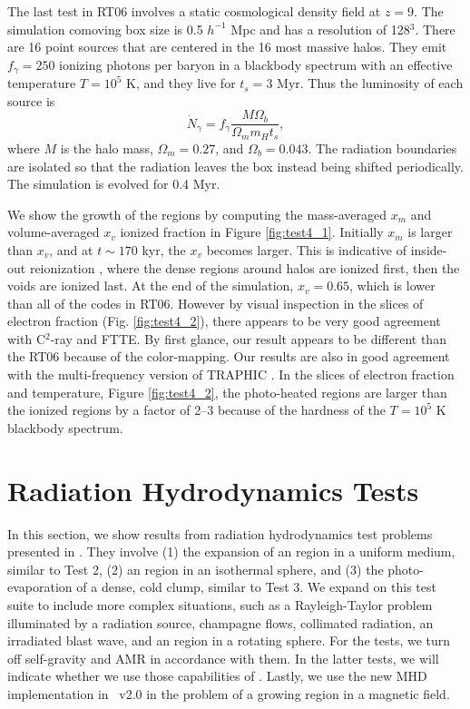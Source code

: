 \documentclass[apj,onecolumn]{emulateapj}
\begin{document}
The last test in RT06 involves a static cosmological density field at
$z=9$.  The simulation comoving box size is 0.5 $h^{-1}$ Mpc and has a
resolution of 128$^3$.  There are 16 point sources that are centered
in the 16 most massive halos.  They emit $f_\gamma = 250$ ionizing
photons per baryon in a blackbody spectrum with an effective
temperature $T = 10^5$ K, and they live for $t_s = 3$ Myr.  Thus the
luminosity of each source is
%
\begin{equation}
  \label{eqn:cosmo_lum}
  \dot{N}_\gamma = f_\gamma \frac{M \Omega_b} {\Omega_m m_H t_s},
\end{equation}
where $M$ is the halo mass, $\Omega_m = 0.27$, and $\Omega_b =
0.043$.  The radiation boundaries are isolated so that the radiation
leaves the box instead being shifted periodically.  The simulation is
evolved for 0.4 Myr.

We show the growth of the  regions by computing the
mass-averaged $x_m$ and volume-averaged $x_v$ ionized fraction in
Figure \ref{fig:test4_1}.  Initially $x_m$ is larger than $x_v$, and
at $t \sim 170$ kyr, the $x_v$ becomes larger.  This is indicative of
inside-out reionization \citep[e.g.][]{Gnedin00, Miralda00,
  Sokasian03}, where the dense regions around halos are ionized first,
then the voids are ionized last.  At the end of the simulation, $x_v =
0.65$, which is lower than all of the codes in RT06.  However by
visual inspection in the slices of electron fraction
(Fig. \ref{fig:test4_2}), there appears to be very good agreement with
C$^2$-ray and FTTE.  By first glance, our result appears to be
different than the RT06 because of the color-mapping.  Our results are
also in good agreement with the multi-frequency version of TRAPHIC
\citep[][see also for better representations of the electron fraction
  slices]{Pawlik10}.  In the slices of electron fraction and
temperature, Figure \ref{fig:test4_2}, the photo-heated regions are
larger than the ionized regions by a factor of 2--3 because of the
hardness of the $T = 10^5$ K blackbody spectrum.

\section{Radiation Hydrodynamics Tests}
\label{sec:radhydro}

In this section, we show results from radiation hydrodynamics test
problems presented in \citet[][hereafter RT09]{Iliev09}.  They involve
(1) the expansion of an  region in a uniform medium, similar
to Test 2, (2) an  region in an isothermal sphere, and (3)
the photo-evaporation of a dense, cold clump, similar to Test 3.  We
expand on this test suite to include more complex situations, such as
a Rayleigh-Taylor problem illuminated by a radiation source, champagne
flows, collimated radiation, an irradiated blast wave, and an
 region in a rotating sphere.  For the \citeauthor{Iliev09}
tests, we turn off self-gravity and AMR in accordance with them.  In
the latter tests, we will indicate whether we use those capabilities
of \enzo.  Lastly, we use the new MHD implementation in \enzo~v2.0 in
the problem of a growing  region in a magnetic field.
\end{document}
